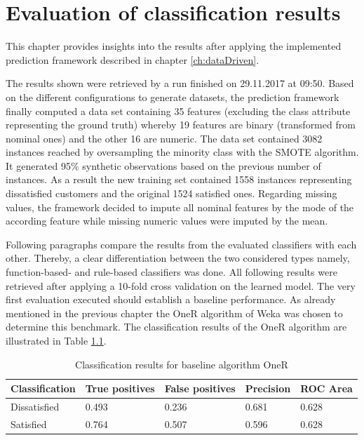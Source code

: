 \chapter{Evaluation of classification results}
\label{ch:evaluation}

This chapter provides insights into the results after applying the implemented prediction framework described in chapter \ref{ch:dataDriven}. 

The results shown were retrieved by a run finished on 29.11.2017 at 09:50. Based on the different configurations to generate datasets, the prediction framework finally computed a data set containing 35 features (excluding the class attribute representing the ground truth) whereby 19 features are binary (transformed from nominal ones) and the other 16 are numeric. The data set contained 3082 instances reached by oversampling the minority class with the SMOTE algorithm. It generated 95\% synthetic observations based on the previous number of instances. As a result the new training set contained 1558 instances representing dissatisfied customers and the original 1524 satisfied ones. Regarding missing values, the framework decided to impute all nominal features by the mode of the according feature while missing numeric values were imputed by the mean.  	

Following paragraphs compare the results from the evaluated classifiers with each other. Thereby, a clear differentiation between the two considered types namely, function-based- and rule-based classifiers was done. All following results were retrieved after applying a 10-fold cross validation on the learned model. The very first evaluation executed should establish a baseline performance. As already mentioned in the previous chapter the OneR algorithm of Weka was chosen to determine this benchmark. The classification results of the OneR algorithm are illustrated in Table \ref{tab:oneR}. 

\begin{table}[]
	\centering
	\begin{tabular}{|l|l|l|l|l|}
		\hline
		\textbf{Classification} & \textbf{True positives} & \textbf{False positives} & \textbf{Precision} & \textbf{ROC Area} \\ \hline
		Dissatisfied            & 0.493                 & 0.236                    & 0.681              & 0.628             \\ \hline
		Satisfied               & 0.764                   & 0.507                    & 0.596                & 0.628             \\ \hline
	\end{tabular}
	\caption{Classification results for baseline algorithm OneR}
	\label{tab:oneR}
\end{table}

